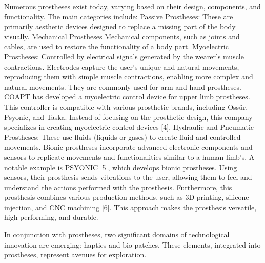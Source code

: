 


Numerous prostheses exist today, varying based on their design, components, and functionality. The main categories include:
Passive Prostheses: These are primarily aesthetic devices designed to replace a missing part of the body visually.
Mechanical Prostheses Mechanical components, such as joints and cables, are used to restore the functionality of a body part.
Myoelectric Prostheses: Controlled by electrical signals generated by the wearer's muscle contractions. Electrodes capture the user's unique and natural movements, reproducing them with simple muscle contractions, enabling more complex and natural movements. They are commonly used for arm and hand prostheses. COAPT has developed a myoelectric control device for upper limb prostheses. This controller is compatible with various prosthetic brands, including Ossür, Psyonic, and Taska. Instead of focusing on the prosthetic design, this company specializes in creating myoelectric control devices [4].
Hydraulic and Pneumatic Prostheses: These use fluids (liquids or gases) to create fluid and controlled movements.
Bionic prostheses incorporate advanced electronic components and sensors to replicate movements and functionalities similar to a human limb’s. A notable example is PSYONIC [5], which develops bionic prostheses. Using sensors, their prosthesis sends vibrations to the user, allowing them to feel and understand the actions performed with the prosthesis. Furthermore, this prosthesis combines various production methods, such as 3D printing, silicone injection, and CNC machining [6]. This approach makes the prosthesis versatile, high-performing, and durable.

In conjunction with prostheses, two significant domains of technological innovation are emerging: haptics and bio-patches. These elements, integrated into prostheses, represent avenues for exploration.

